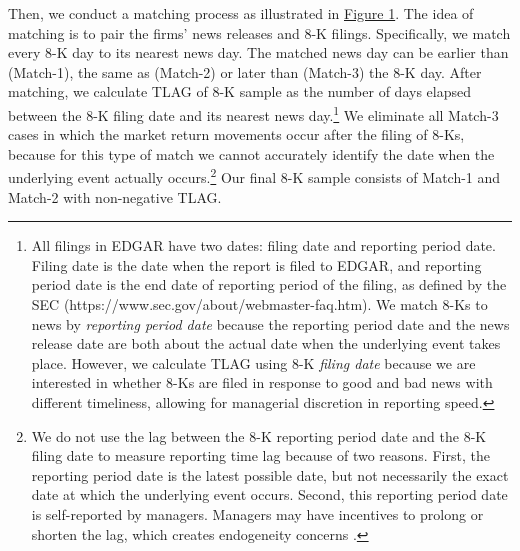 \documentclass[a4paper]{article}
\begin{document}
\begin{spacing}{2}
Then, we conduct a matching process as illustrated in \hyperref[fig1]{Figure 1}. The idea of matching is to pair the firms' news releases and 8-K filings. Specifically, we match every 8-K day to its nearest news day. The matched news day can be earlier than (Match-1), the same as (Match-2) or later than (Match-3) the 8-K day. After matching, we calculate TLAG of 8-K sample as the number of days elapsed between the 8-K filing date and its nearest news day.\footnote{All filings in EDGAR have two dates: filing date and reporting period date. Filing date is the date when the report is filed to EDGAR, and reporting period date is the end date of reporting period of the filing, as defined by the SEC (https://www.sec.gov/about/webmaster-faq.htm). We match 8-Ks to news by \textit{reporting period date} because the reporting period date and the news release date are both about the actual date when the underlying event takes place. However, we calculate TLAG using 8-K \textit{filing date} because we are interested in whether 8-Ks are filed in response to good and bad news with different timeliness, allowing for managerial discretion in reporting speed.} We eliminate all Match-3 cases in which the market return movements occur after the filing of 8-Ks, because for this type of match we cannot accurately identify the date when the underlying event actually occurs.\footnote{We do not use the lag between the 8-K reporting period date and the 8-K filing date to measure reporting time lag because of two reasons. First, the reporting period date is the latest possible date, but not necessarily the exact date at which the underlying event occurs. Second, this reporting period date is self-reported by managers. Managers may have incentives to prolong or shorten the lag, which creates endogeneity concerns \cite{chapmanInformationOverloadDisclosure2019}.} Our final 8-K sample consists of Match-1 and Match-2 with non-negative TLAG.


\end{spacing}
\end{document}
